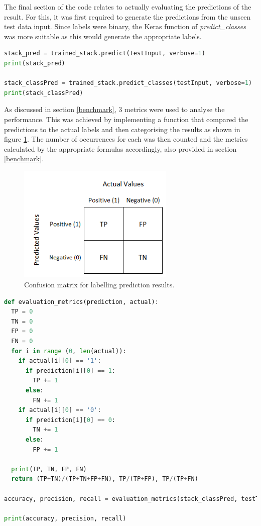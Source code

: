 \documentclass[10pt,onecolumn,letterpaper]{article}
\begin{document}
The final section of the code relates to actually evaluating the predictions of the result. For this, it was first required to generate the predictions from the unseen test data input. Since labels were binary, the Keras function of \textit{predict\_classes} was more suitable as this would generate the appropriate labels. \\

\begin{lstlisting}[language=Python, breaklines=true, caption= {Keras predict functions to generate predicted labels from test data.}]
stack_pred = trained_stack.predict(testInput, verbose=1)
print(stack_pred)

stack_classPred = trained_stack.predict_classes(testInput, verbose=1)
print(stack_classPred)
\end{lstlisting} 

As discussed in section \ref{benchmark}, 3 metrics were used to analyse the performance. This was achieved by implementing a function that compared the predictions to the actual labels and then categorising the results as shown in figure \ref{confusion_matrix}. The number of occurrences for each was then counted and the metrics calculated by the appropriate formulas accordingly, also provided in section \ref{benchmark}.

\begin{figure}[!hbt!]
\centering
\includegraphics[width=7.5cm]{confusion_matrix.png}
\caption{Confusion matrix for labelling prediction results.}
\label{confusion_matrix}
\end{figure}

\begin{lstlisting}[language=Python, breaklines=true, caption= Implemented function which evaluates the model prediction performance based on accuracy\, precision and recall.]
def evaluation_metrics(prediction, actual):
  TP = 0
  TN = 0
  FP = 0
  FN = 0
  for i in range (0, len(actual)):
    if actual[i][0] == '1':
      if prediction[i][0] == 1:
        TP += 1
      else:
        FN += 1
    if actual[i][0] == '0':
      if prediction[i][0] == 0:
        TN += 1
      else: 
        FP += 1
     
  print(TP, TN, FP, FN)
  return (TP+TN)/(TP+TN+FP+FN), TP/(TP+FP), TP/(TP+FN)

accuracy, precision, recall = evaluation_metrics(stack_classPred, testTarget)

print(accuracy, precision, recall)
\end{lstlisting} 
\end{document}
